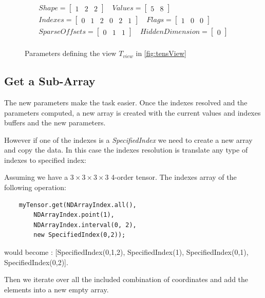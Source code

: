 \begin{figure}[!h]

		\[
		\begin{aligned}
		Shape = 
		\begin{bmatrix}
		1 & 2 & 2 
		\end{bmatrix}
		\quad
		Values = 
		\begin{bmatrix}
		5 & 8 
		\end{bmatrix}\\			
		Indexes = 
		\begin{bmatrix}
		0 &  1 & 2 & 0 & 2 & 1
		\end{bmatrix}		
		\quad	
		Flags = 
		\begin{bmatrix}
		1 & 0 & 0
		\end{bmatrix}\\			
		SparseOffsets = 
		\begin{bmatrix}
		0 &  1 & 1
		\end{bmatrix}
		\quad		
		HiddenDimension = 
		\begin{bmatrix}
		0 
		\end{bmatrix}\\			
		\end{aligned}
		\]
		\caption{Parameters defining the view $T_{view}$ in \ref{fig:tensView}}
		\label{eqn:viewParams}
\end{figure}

\subsection{Get a Sub-Array}

The new parameters make the task easier. Once the indexes resolved and the parameters computed, a new array is created with the current values and indexes buffers and the new parameters. 

However if one of the indexes is a \textit{SpecifiedIndex} we need to create a new array and copy the data. In this case the indexes resolution is translate any type of indexes to specified index:

Assuming we have a $3 \times 3 \times 3  \times 3$ 4-order tensor. The indexes array of the following operation:
\begin{lstlisting}
	myTensor.get(NDArrayIndex.all(),
		NDArrayIndex.point(1),
		NDArrayIndex.interval(0, 2),
		new SpecifiedIndex(0,2));
\end{lstlisting}
  would become : [SpecifiedIndex(0,1,2), SpecifiedIndex(1), SpecifiedIndex(0,1), SpecifiedIndex(0,2)]. 

Then we iterate over all the included combination of coordinates and add the elements into a new empty array.

